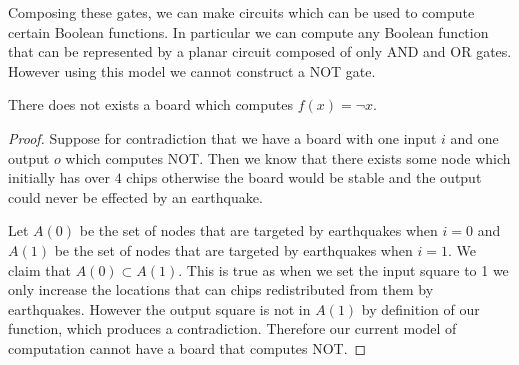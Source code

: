 \documentclass[runningheads,a4paper]{llncs}
\begin{document}
Composing these gates, we can make circuits which can be used to compute certain Boolean functions. In particular we can compute any Boolean function that can be represented by a planar circuit composed of only AND and OR gates. However using this model we cannot construct a NOT gate.  

\begin{theorem}
There does not exists a board which computes $f(x) = \neg x$.
\end{theorem}

\begin{proof}
Suppose for contradiction that we have a board with one input $i$ and one output $o$ which computes NOT.  Then we know that there exists some node which initially has over $4$ chips otherwise the board would be stable and the output could never be effected by an earthquake. 

Let $A(0)$ be the set of nodes that are targeted by earthquakes when $i = 0$ and $A(1)$ be the set of nodes that are targeted by earthquakes when $i=1$.  We claim that $A(0) \subset A(1)$. This is true as when we set the input square to 1 we only increase the locations that can chips redistributed from them by earthquakes. However the output square is not in $A(1)$ by definition of our function, which produces a contradiction.  Therefore our current model of computation cannot have a board that computes NOT. 
\end{proof}



\end{document}
